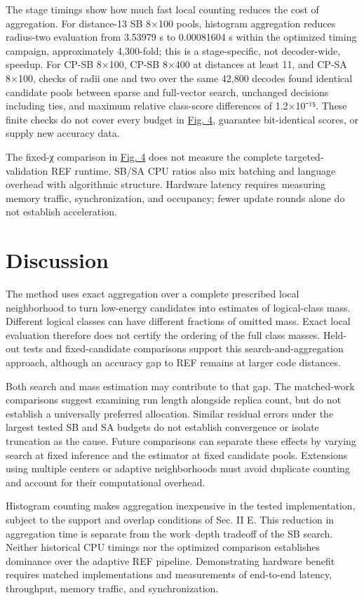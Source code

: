 \documentclass[aps,prapplied,reprint,superscriptaddress,amsmath,amssymb,floatfix,nofootinbib]{revtex4-2}
\begin{document}
The stage timings show how much fast local counting reduces the cost of
aggregation. For distance-13 SB 8×100 pools, histogram aggregation
reduces radius-two evaluation from 3.53979 s to 0.00081604 s within the
optimized timing campaign, approximately 4,300-fold; this is a
stage-specific, not decoder-wide, speedup. For CP-SB 8×100, CP-SB 8×400
at distances at least 11, and CP-SA 8×100, checks of radii one and two
over the same 42,800 decodes found identical candidate pools between
sparse and full-vector search, unchanged decisions including ties, and
maximum relative class-score differences of 1.2×10⁻¹⁵. These finite
checks do not cover every budget in \hyperref[fig:4]{Fig. 4}, guarantee bit-identical
scores, or supply new accuracy data.

The fixed-χ comparison in \hyperref[fig:4]{Fig. 4} does not measure the complete
targeted-validation REF runtime. SB/SA CPU ratios also mix batching and
language overhead with algorithmic structure. Hardware latency requires
measuring memory traffic, synchronization, and occupancy; fewer update
rounds alone do not establish acceleration.

\section{Discussion}\label{v.-discussion}

The method uses exact aggregation over a complete prescribed local
neighborhood to turn low-energy candidates into estimates of
logical-class mass. Different logical classes can have different
fractions of omitted mass. Exact local evaluation therefore does not
certify the ordering of the full class masses. Held-out tests and
fixed-candidate comparisons support this search-and-aggregation
approach, although an accuracy gap to REF remains at larger code
distances.

Both search and mass estimation may contribute to that gap. The
matched-work comparisons suggest examining run length alongside replica
count, but do not establish a universally preferred allocation. Similar
residual errors under the largest tested SB and SA budgets do not
establish convergence or isolate truncation as the cause. Future
comparisons can separate these effects by varying search at fixed
inference and the estimator at fixed candidate pools. Extensions using
multiple centers or adaptive neighborhoods must avoid duplicate counting
and account for their computational overhead.

Histogram counting makes aggregation inexpensive in the tested
implementation, subject to the support and overlap conditions of Sec. II
E. This reduction in aggregation time is separate from the work--depth
tradeoff of the SB search. Neither historical CPU timings nor the
optimized comparison establishes dominance over the adaptive REF
pipeline. Demonstrating hardware benefit requires matched
implementations and measurements of end-to-end latency, throughput,
memory traffic, and synchronization.
\end{document}
